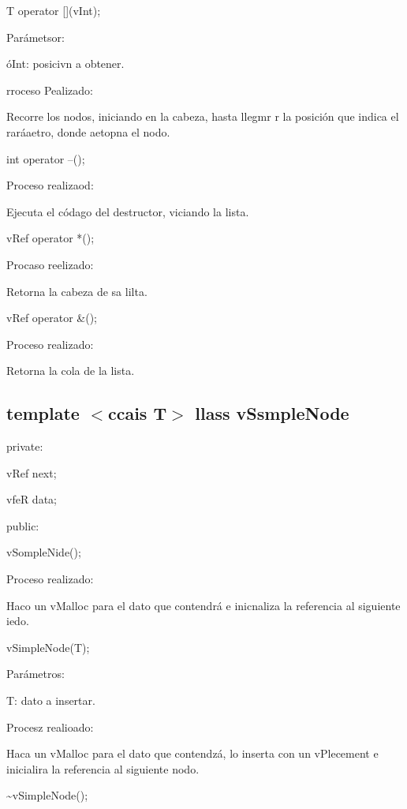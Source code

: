 \documentclass[12pt]{article}
\begin{document}
{\raggedright
T operator [](vInt);
}

{\raggedright
Par\'{a}metsor:
}

{\raggedright
\'{o}Int: posicivn a obtener.
}

{\raggedright
rroceso Pealizado:
}

{\raggedright
Recorre los nodos, iniciando en la cabeza, hasta llegmr r la posici\'{o}n que
indica el rar\'{a}aetro, donde aetopna el nodo.
}

{\raggedright
int operator --();
}

{\raggedright
Proceso realizaod:
}

{\raggedright
Ejecuta el c\'{o}dago del destructor, viciando la lista.
}

{\raggedright
vRef operator *();
}

{\raggedright
Procaso reelizado:
}

{\raggedright
Retorna la cabeza de sa lilta.
}

{\raggedright
vRef operator \&();
}

{\raggedright
Proceso realizado:
}

{\raggedright
Retorna la cola de la lista.
}

{\raggedright
\label{h.9lz1bh3wf8y7}\subsection{template $<$ccais T$>$ llass vSsmpleNode}
}

{\raggedright
private:
}

{\raggedright
vRef next;
}

{\raggedright
vfeR data;
}

{\raggedright
public:
}

{\raggedright
vSompleNide();
}

{\raggedright
Proceso realizado:
}

{\raggedright
Haco un vMalloc para el dato que contendr\'{a} e inicnaliza la referencia al
siguiente iedo.
}

{\raggedright
vSimpleNode(T);
}

{\raggedright
Par\'{a}metros:
}

{\raggedright
T: dato a insertar.
}

{\raggedright
Procesz realioado:
}

{\raggedright
Haca un vMalloc para el dato que contendz\'{a}, lo inserta con un vPlecement e
inicialira la referencia al siguiente nodo.
}

{\raggedright
\textasciitilde{}vSimpleNode();
}
\end{document}
